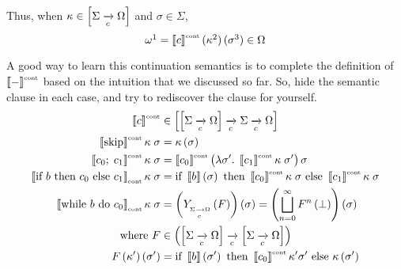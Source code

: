 \begin{enumcirc}
	Thus, when $\kappa \in \left[ \Sigma \xrightarrow[c]{} \Omega \right]$ and $\sigma \in \Sigma$,
	\[
		\omega\footnotemark =
		\supsctext{\bbrackets{c}}{cont}
		\prths{\kappa\footnotemark}
		\prths{\sigma\footnotemark} \in \Omega
	\]
	\item
	A good way to learn this continuation semantics is to complete the definition
	of $\left\llbracket - \right\rrbracket^{\textrm{\tiny cont}}$ based on the intuition that we discussed
	so far.
	So, hide the semantic clause in each case, and try to rediscover the clause for
	yourself.
	\begin{align*}
		\supsctext{\bbrackets{c}}{cont}                               &
		\in \brackets{\brackets{\Sigma \toc \Omega} \toc \Sigma \toc \Omega}                                                                  \\
		\supsctext{\bbrackets{\cskip}}{cont}\kappa\;\sigma            &
		= \kappa\prths{\sigma}                                                                                                                \\
		\supsctext{\bbrackets{\cseq{c_0}{c_1}}}{cont}\kappa\;\sigma   &
		= \supsctext{\bbrackets{c_0}}{cont}
		\prths{\lambda \sigma^\prime.\; \supsctext{\bbrackets{c_1}}{cont}\kappa\;\sigma^\prime}\sigma                                         \\
		\subsctext{\bbrackets{\cif{b}{c_0}{c_1}}}{cont}\kappa\;\sigma &
		= \cif{\bbrackets{b}\prths{\sigma}}{\supsctext{\bbrackets{c_0}}{cont}\kappa\;\sigma}{\supsctext{\bbrackets{c_1}}{cont}\kappa\;\sigma} \\
		\subsctext{\bbrackets{\cwhile{b}{c_0}}}{cont}\kappa\;\sigma   &
		= \prths{\subscmath{Y}{\Sigma \toc \Omega} \prths{F}} \prths{\sigma}
		= \prths{\bigsqcup_{n=0}^\infty F^n\prths{\bot}}\prths{\sigma}                                                                        \\
		\textrm{where } F                                             &
		\in \prths{\brackets{\Sigma \toc \Omega} \toc \brackets{\Sigma \toc \Omega}}                                                          \\
		F \prths{\kappa^\prime}\prths{\sigma^\prime}                  &
		= \cif{\bbrackets{b}\prths{\sigma^\prime}}
		{\supsctext{\bbrackets{c_0}}{cont}\kappa^\prime\sigma^\prime}
		{\kappa\prths{\sigma^\prime}}                                                                                                         \\

\end{align*}
\end{enumcirc}
